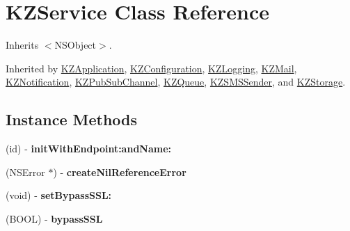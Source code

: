 \hypertarget{interface_k_z_service}{\section{K\-Z\-Service Class Reference}
\label{interface_k_z_service}
}


Inherits $<$\-N\-S\-Object$>$.



Inherited by \hyperlink{interface_k_z_application}{K\-Z\-Application}, \hyperlink{interface_k_z_configuration}{K\-Z\-Configuration}, \hyperlink{interface_k_z_logging}{K\-Z\-Logging}, \hyperlink{interface_k_z_mail}{K\-Z\-Mail}, \hyperlink{interface_k_z_notification}{K\-Z\-Notification}, \hyperlink{interface_k_z_pub_sub_channel}{K\-Z\-Pub\-Sub\-Channel}, \hyperlink{interface_k_z_queue}{K\-Z\-Queue}, \hyperlink{interface_k_z_s_m_s_sender}{K\-Z\-S\-M\-S\-Sender}, and \hyperlink{interface_k_z_storage}{K\-Z\-Storage}.

\subsection*{Instance Methods}
\begin{DoxyCompactItemize}
\item 
\hypertarget{interface_k_z_service_abd709ce64e2ac9c0465160267b47c67b}{(id) -\/ {\bfseries init\-With\-Endpoint\-:and\-Name\-:}}\label{interface_k_z_service_abd709ce64e2ac9c0465160267b47c67b}

\item 
\hypertarget{interface_k_z_service_adfa016d6af675676e3d16154e9dbdba7}{(N\-S\-Error $\ast$) -\/ {\bfseries create\-Nil\-Reference\-Error}}\label{interface_k_z_service_adfa016d6af675676e3d16154e9dbdba7}

\item 
\hypertarget{interface_k_z_service_a3a3029a07bc90af29fd62510cfd2915e}{(void) -\/ {\bfseries set\-Bypass\-S\-S\-L\-:}}\label{interface_k_z_service_a3a3029a07bc90af29fd62510cfd2915e}

\item 
\hypertarget{interface_k_z_service_a9db8b034844c904d58fef1cfbc871843}{(B\-O\-O\-L) -\/ {\bfseries bypass\-S\-S\-L}}\label{interface_k_z_service_a9db8b034844c904d58fef1cfbc871843}

\end{DoxyCompactItemize}
